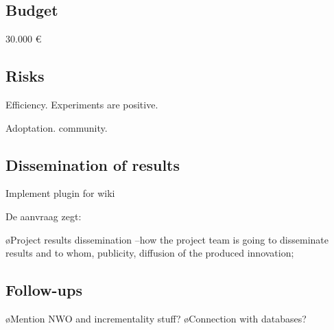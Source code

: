 \documentclass[10pt]{article}
\begin{document}
\subsection{Budget}

30.000 \euro

\subsection{Risks}

Efficiency. Experiments are positive.

Adoptation. community. 

\subsection{Dissemination of results}

Implement plugin for wiki

De aanvraag zegt:

\bl
\o Project results dissemination --how the project team is going to disseminate results and to whom, publicity, diffusion of the produced innovation;
\el


\subsection{Follow-ups}


\bl
\o Mention NWO and incrementality stuff?
\o Connection with databases?
\el




\end{document}
